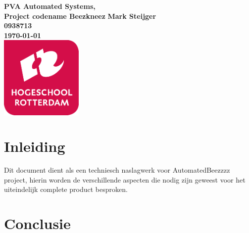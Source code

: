 \documentclass{article}
\begin{document}
\sffamily
\begin{titlepage}
  \centering
    \vfill
    {\bfseries\Huge
      PVA Automated Systems, \\
      Project codename Beezkneez
        \vskip2cm
      }
      {\bfseries\Large
        Mark Steijger\\
      }
      {
        \bfseries\normalsize
        0938713\\
        \vskip1cm
        \today\\
    }    
    \vfill
    \includegraphics[width=4cm]{logohr.png} %
    \vfill
    \vfill
\end{titlepage}
\newpage
\tableofcontents

\newpage
\section{Inleiding}
Dit document dient als een techniesch naslagwerk voor AutomatedBeezzzz project, hierin worden de verschillende aspecten
die nodig zijn geweest voor het uiteindelijk complete product besproken. \cite{akbari_mohammadi_ziarati_2010}










\section{Conclusie}


\newpage


\end{document}
